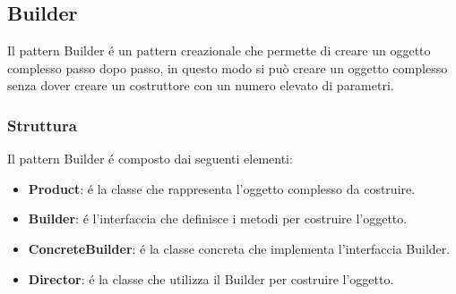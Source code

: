 \documentclass[11pt]{article}
\begin{document}
\subsection{Builder}
Il pattern Builder é un pattern creazionale che permette di creare un oggetto complesso passo dopo passo, in questo modo si può creare un oggetto complesso senza dover creare un costruttore con un numero elevato di parametri.
\subsubsection{Struttura}
Il pattern Builder é composto dai seguenti elementi:
\begin{itemize}
    \item \textbf{Product}: é la classe che rappresenta l'oggetto complesso da costruire.
    \item \textbf{Builder}: é l'interfaccia che definisce i metodi per costruire l'oggetto.
    \item \textbf{ConcreteBuilder}: é la classe concreta che implementa l'interfaccia Builder.
    \item \textbf{Director}: é la classe che utilizza il Builder per costruire l'oggetto.
    \end{itemize}
\end{document}
